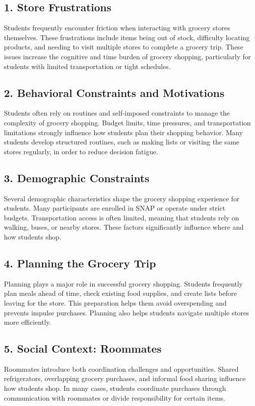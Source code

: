 \documentclass[11pt]{article}
\begin{document}
\subsection*{1. Store Frustrations}
Students frequently encounter friction when interacting with grocery stores themselves. These frustrations include items being out of stock, difficulty locating products, and needing to visit multiple stores to complete a grocery trip. These issues increase the cognitive and time burden of grocery shopping, particularly for students with limited transportation or tight schedules.

\subsection*{2. Behavioral Constraints and Motivations}
Students often rely on routines and self-imposed constraints to manage the complexity of grocery shopping. Budget limits, time pressures, and transportation limitations strongly influence how students plan their shopping behavior. Many students develop structured routines, such as making lists or visiting the same stores regularly, in order to reduce decision fatigue.

\subsection*{3. Demographic Constraints}
Several demographic characteristics shape the grocery shopping experience for students. Many participants are enrolled in SNAP or operate under strict budgets. Transportation access is often limited, meaning that students rely on walking, buses, or nearby stores. These factors significantly influence where and how students shop.

\subsection*{4. Planning the Grocery Trip}
Planning plays a major role in successful grocery shopping. Students frequently plan meals ahead of time, check existing food supplies, and create lists before leaving for the store. This preparation helps them avoid overspending and prevents impulse purchases. Planning also helps students navigate multiple stores more efficiently.

\subsection*{5. Social Context: Roommates}
Roommates introduce both coordination challenges and opportunities. Shared refrigerators, overlapping grocery purchases, and informal food sharing influence how students shop. In many cases, students coordinate purchases through communication with roommates or divide responsibility for certain items.
\end{document}
